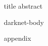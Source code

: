 \documentclass[USenglish,oneside,twocolumn]{article}
\begin{document}
{title}
{abstract}

\ifdgruyter
    \maketitle
\fi
\iflncs
  \thispagestyle{plain}
\fi
{darknet-body}

\newpage

\iflncs
    
    
\fi
\ifdgruyter
    \printbibliography
\fi
\appendix
{appendix}
\end{document}
